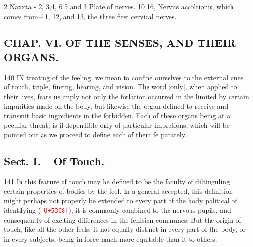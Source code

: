 \documentclass[10pt]{article}
\newcommand{\unk}[1]{\textcolor{red}{\texttt{\scriptsize[U+#1]}}}
\begin{document}
\begin{multicols}{2}
Naxxta - 2, 3,4, 6 5 and 3 Plate of nerves. 10 16, Nervus accoltionis, which comes from--11, 12, and 13, the three first cervical nerves.

\subsection*{CHAP. VI. OF THE SENSES, AND THEIR ORGANS.}
140 IN treating of the feeling, we mean to confine ourselves to the external ones of touch, triple, fineing, hearing, and vision. The word [only], when applied to their lives, fears us imply not only the forlation occurred in the limited by certain impurities made on the body, but likewise the organ defined to receive and transmit basic ingredients in the forbidden. Each of these organs being at a peculiar threat, is if dependible only of particular impretions, which will be pointed out as we proceed to define each of them fe parately.

\subsection*{Sect. I. \_Of Touch.\_}
\end{multicols}
141 In this feature of touch may be defined to be the faculty of diltinguling certain properties of bodies by the feel. In a general accepted, this definition might perhaps not properly be extended to every part of the body political of identifying (\unk{53C8}), it is commonly combined to the nervous pupils, and consequently of exciting differences in the fenision communes. But the origin of touch, like all the other feels, it not equally distinct in every part of the body, or in every subjects, being in force much more equitable than it to others.
\end{document}
